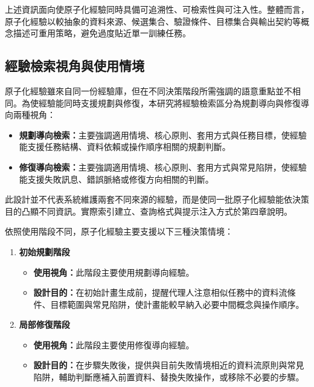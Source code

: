 \begin{ZhChapter}
上述資訊面向使原子化經驗同時具備可追溯性、可檢索性與可注入性。整體而言，原子化經驗以較抽象的資料來源、候選集合、驗證條件、目標集合與輸出契約等概念描述可重用策略，避免過度貼近單一訓練任務。

\subsection{經驗檢索視角與使用情境}

原子化經驗雖來自同一份經驗庫，但在不同決策階段所需強調的語意重點並不相同。為使經驗能同時支援規劃與修復，本研究將經驗檢索區分為規劃導向與修復導向兩種視角：

\begin{itemize}
    \item \textbf{規劃導向檢索：}主要強調適用情境、核心原則、套用方式與任務目標，使經驗能支援任務結構、資料依賴或操作順序相關的規劃判斷。
    \item \textbf{修復導向檢索：}主要強調適用情境、核心原則、套用方式與常見陷阱，使經驗能支援失敗訊息、錯誤脈絡或修復方向相關的判斷。
\end{itemize}

此設計並不代表系統維護兩套不同來源的經驗，而是使同一批原子化經驗能依決策目的凸顯不同資訊。實際索引建立、查詢格式與提示注入方式於第四章說明。

依照使用階段不同，原子化經驗主要支援以下三種決策情境：

\begin{enumerate}
    \item \textbf{初始規劃階段}

    \begin{itemize}
        \item \textbf{使用視角：}此階段主要使用規劃導向經驗。
        \item \textbf{設計目的：}在初始計畫生成前，提醒代理人注意相似任務中的資料流條件、目標範圍與常見陷阱，使計畫能較早納入必要中間概念與操作順序。
    \end{itemize}

    \item \textbf{局部修復階段}

    \begin{itemize}
        \item \textbf{使用視角：}此階段主要使用修復導向經驗。
        \item \textbf{設計目的：}在步驟失敗後，提供與目前失敗情境相近的資料流原則與常見陷阱，輔助判斷應補入前置資料、替換失敗操作，或移除不必要的步驟。
    \end{itemize}


\end{enumerate}
\end{ZhChapter}
